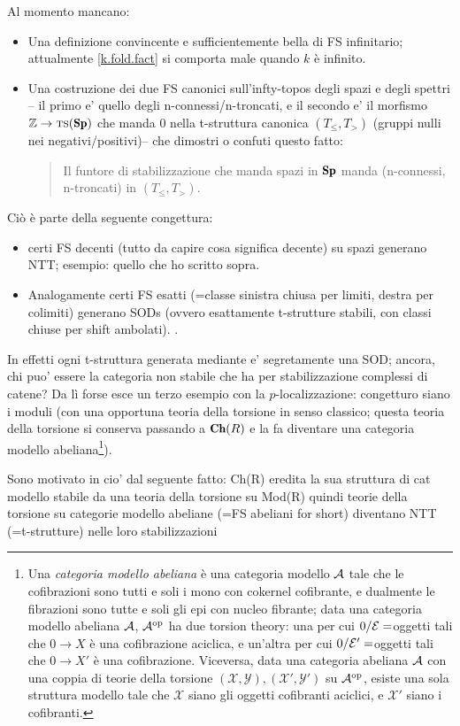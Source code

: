 \documentclass[a4paper,12pt]{amsart}
\begin{document}
Al momento mancano:
\begin{itemize}
	\item Una definizione convincente e sufficientemente bella di FS infinitario; attualmente \ref{k.fold.fact} si comporta male quando $k$ è infinito.
	\item Una costruzione dei due FS canonici sull'infty-topos degli spazi e degli spettri -- il primo e' quello degli n-connessi/n-troncati, e il secondo e' il morfismo $\Z \to \ts(\cate{Sp})$ che manda 0 nella t-struttura canonica $(T_{\le}, T_{>})$ (gruppi nulli nei negativi/positivi)-- che dimostri o confuti questo fatto:
	\begin{quote}
		Il funtore di stabilizzazione che manda spazi in $\cate{Sp}$ manda (n-connessi, n-troncati) in $(T_{\le}, T_{>})$.
	\end{quote}
\end{itemize}

Ciò è parte della seguente congettura: 
\begin{itemize}
	\item certi FS decenti (tutto da capire cosa significa decente) su spazi generano NTT; esempio: quello che ho scritto sopra.
	\item Analogamente certi FS esatti (=classe sinistra chiusa per limiti, destra per colimiti) generano SODs (ovvero esattamente t-strutture stabili, con classi chiuse per shift ambolati). \cite[3.2.1]{tstructures}.
\end{itemize}
In effetti ogni t-struttura generata mediante \cite[3.2.1]{tstructures} e' segretamente una SOD; ancora, chi puo' essere la categoria non stabile che ha per stabilizzazione complessi di catene? Da lì forse esce un terzo esempio con la $p$-localizzazione: congetturo siano i moduli (con una opportuna teoria della torsione in senso classico; questa teoria della torsione si conserva passando a $\Ch(R)$ e la fa diventare una categoria modello abeliana\footnote{Una \emph{categoria modello abeliana} è una categoria modello $\mathcal{A}$ tale che le cofibrazioni sono tutti e soli i mono con cokernel cofibrante, e dualmente le fibrazioni sono tutte e soli gli epi con nucleo fibrante; data una categoria modello abeliana $\mathcal{A}$, $\mathcal{A}^{\text{op}}$ ha due torsion theory: una per cui $0/\mathcal{E} = $oggetti tali che $0\to X$ è una cofibrazione aciclica, e un'altra per cui $0/\mathcal{E}' = $oggetti tali che $0\to X'$ è una cofibrazione. Viceversa, data una categoria abeliana $\mathcal{A}$ con una coppia di teorie della torsione $(\mathcal{X}, \mathcal{Y}),(\mathcal{X}', \mathcal{Y}')$ su $\mathcal{A}^{\text{op}}$, esiste una sola struttura modello tale che $\mathcal X$ siano gli oggetti cofibranti aciclici, e $\mathcal{X}'$ siano i cofibranti.}).

Sono motivato in cio' dal seguente fatto: Ch(R) eredita la sua struttura di cat modello stabile da una teoria della torsione su Mod(R)
quindi teorie della torsione su categorie modello abeliane (=FS abeliani for short) diventano NTT (=t-strutture) nelle loro stabilizzazioni
\end{document}
